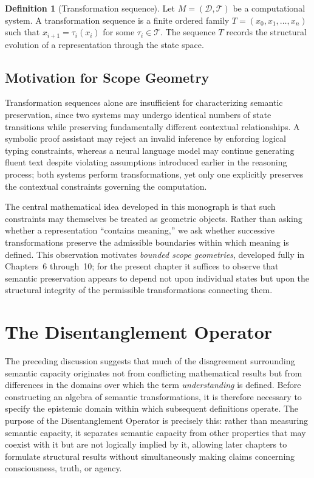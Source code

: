 \documentclass[11pt,twoside,openright]{book}
\numberwithin{equation}{chapter}
\theoremstyle{definition}
\newtheorem{definition}{Definition}[chapter]
\theoremstyle{plain}
\theoremstyle{remark}
\theoremstyle{definition}
\newcommand{\Domain}{\mathcal{D}}
\newcommand{\Trans}{\mathcal{T}}
\begin{document}
\begin{definition}[Transformation sequence]
Let $M=(\Domain,\Trans)$ be a computational system. A transformation
sequence is a finite ordered family $T=(x_0,x_1,\ldots,x_n)$ such that
$x_{i+1}=\tau_i(x_i)$ for some $\tau_i\in\Trans$. The sequence $T$ records
the structural evolution of a representation through the state space.
\end{definition}

\subsection{Motivation for Scope Geometry}

Transformation sequences alone are insufficient for characterizing
semantic preservation, since two systems may undergo identical numbers of
state transitions while preserving fundamentally different contextual
relationships. A symbolic proof assistant may reject an invalid inference
by enforcing logical typing constraints, whereas a neural language model
may continue generating fluent text despite violating assumptions
introduced earlier in the reasoning process; both systems perform
transformations, yet only one explicitly preserves the contextual
constraints governing the computation.

The central mathematical idea developed in this monograph is that such
constraints may themselves be treated as geometric objects. Rather than
asking whether a representation ``contains meaning,'' we ask whether
successive transformations preserve the admissible boundaries within
which meaning is defined. This observation motivates \emph{bounded scope
geometries}, developed fully in Chapters~6 through~10; for the present
chapter it suffices to observe that semantic preservation appears to
depend not upon individual states but upon the structural integrity of
the permissible transformations connecting them.

\section{The Disentanglement Operator}
\label{sec:disentanglement}

The preceding discussion suggests that much of the disagreement
surrounding semantic capacity originates not from conflicting mathematical
results but from differences in the domains over which the term
\emph{understanding} is defined. Before constructing an algebra of
semantic transformations, it is therefore necessary to specify the
epistemic domain within which subsequent definitions operate. The purpose
of the Disentanglement Operator is precisely this: rather than measuring
semantic capacity, it separates semantic capacity from other properties
that may coexist with it but are not logically implied by it, allowing
later chapters to formulate structural results without simultaneously
making claims concerning consciousness, truth, or agency.
\end{document}
